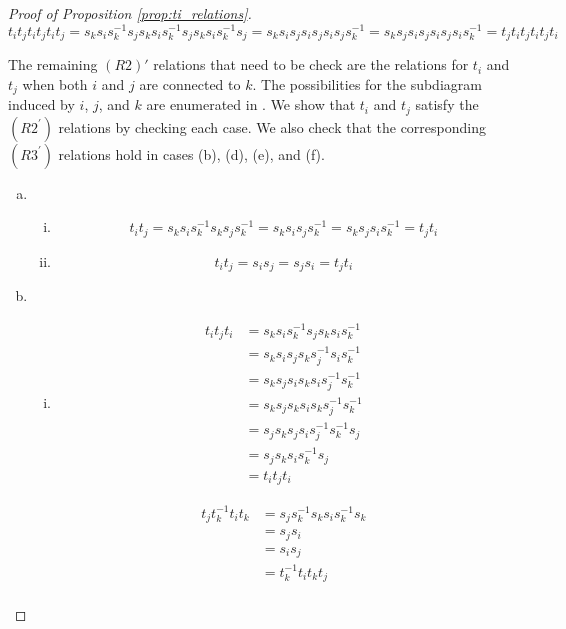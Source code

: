 \documentclass[11pt]{amsart}
\theoremstyle{definition}
\begin{document}
\begin{proof}[Proof of Proposition \ref{prop:ti_relations}]
$$t_it_jt_it_jt_it_j = s_ks_is_k^{-1}s_js_ks_is_k^{-1}s_js_ks_is_k^{-1}s_j = s_ks_is_js_is_js_is_js_k^{-1} = s_ks_js_is_js_is_js_is_k^{-1} = t_jt_it_jt_it_jt_i$$




The remaining $(R2)'$ relations that need to be check are the relations for $t_i$ and $t_j$ when both $i$ and $j$ are connected to $k$.  The possibilities for the subdiagram induced by $i$, $j$, and $k$ are enumerated in .  We show that $t_i$ and $t_j$ satisfy the $(R2^\prime)$ relations by checking each case.  We also check that the corresponding $(R3^\prime)$ relations hold in cases (b), (d), (e), and (f).


\begin{enumerate}[a)]
\item
\begin{enumerate}[i)]
\item $$t_it_j = s_ks_is_k^{-1}s_ks_js_k^{-1} = s_ks_is_js_k^{-1} = s_ks_js_is_k^{-1} = t_jt_i$$
\item $$t_it_j = s_is_j = s_js_i = t_jt_i$$
\end{enumerate}
\item
\begin{enumerate}[i)]
\item
\begin{align*}
t_it_jt_i &= s_ks_is_k^{-1}s_js_ks_is_k^{-1}\\
&= s_ks_is_js_ks_j^{-1}s_is_k^{-1}\\
&= s_ks_js_is_ks_is_j^{-1}s_k^{-1}\\
&= s_ks_js_ks_is_ks_j^{-1}s_k^{-1}\\
&= s_js_ks_js_is_j^{-1}s_k^{-1}s_j\\
&= s_js_ks_is_k^{-1}s_j\\
&= t_it_jt_i
\end{align*}

\begin{align*}
t_jt_k^{-1}t_it_k &= s_js_k^{-1}s_ks_is_k^{-1}s_k\\
&= s_js_i\\
&= s_is_j\\
&= t_k^{-1}t_it_kt_j\\
\end{align*}


\end{enumerate}
\end{enumerate}
\end{proof}
\end{document}
